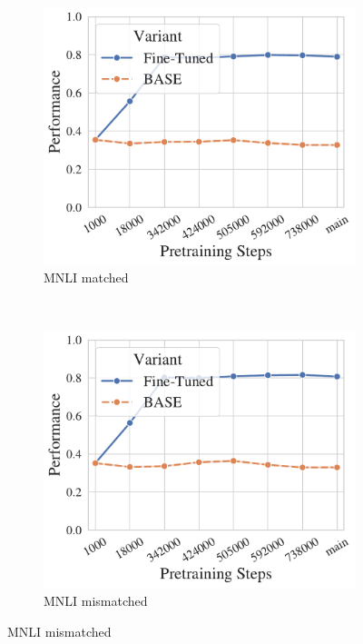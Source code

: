 
\begin{figure}[t!]
    \centering
    \begin{subfigure}[b]{0.3\textwidth}
    \includegraphics[width=\the\columnwidth]{figures/fig_files/ft_ckpts/sft_evalmnli_matched-trainmnli.pdf}
        \caption{MNLI matched}
    \end{subfigure}%
    ~ 
    \begin{subfigure}[b]{0.3\textwidth}
    \includegraphics[width=\the\columnwidth]{figures/fig_files/ft_ckpts/sft_evalmnli_mismatched-trainmnli.pdf}
        \caption{MNLI mismatched}

\end{subfigure}
\end{figure}
